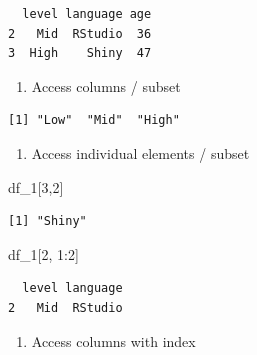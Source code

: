\documentclass[
  letterpaper,
  DIV=11,
  numbers=noendperiod]{scrreprt}
\newenvironment{Shaded}{\begin{snugshade}}{\end{snugshade}}
\newcommand{\DecValTok}[1]{\textcolor[rgb]{0.68,0.00,0.00}{#1}}
\newcommand{\NormalTok}[1]{\textcolor[rgb]{0.00,0.23,0.31}{#1}}
\newcommand{\SpecialCharTok}[1]{\textcolor[rgb]{0.37,0.37,0.37}{#1}}
\providecommand{\tightlist}{%
  \setlength{\itemsep}{0pt}\setlength{\parskip}{0pt}}\usepackage{longtable,booktabs,array}
\begin{document}
\begin{verbatim}
  level language age
2   Mid  RStudio  36
3  High    Shiny  47
\end{verbatim}

\begin{enumerate}
\def\labelenumi{\alph{enumi}.}
\setcounter{enumi}{7}
\tightlist
\item
  Access columns / subset
\end{enumerate}

\begin{Shaded}
\end{Shaded}

\begin{verbatim}
[1] "Low"  "Mid"  "High"
\end{verbatim}

\begin{enumerate}
\def\labelenumi{\roman{enumi}.}
\tightlist
\item
  Access individual elements / subset
\end{enumerate}

\begin{Shaded}
\begin{Highlighting}[]
\NormalTok{df\_1[}\DecValTok{3}\NormalTok{,}\DecValTok{2}\NormalTok{]}
\end{Highlighting}
\end{Shaded}

\begin{verbatim}
[1] "Shiny"
\end{verbatim}

\begin{Shaded}
\begin{Highlighting}[]
\NormalTok{df\_1[}\DecValTok{2}\NormalTok{, }\DecValTok{1}\SpecialCharTok{:}\DecValTok{2}\NormalTok{]}
\end{Highlighting}
\end{Shaded}

\begin{verbatim}
  level language
2   Mid  RStudio
\end{verbatim}

\begin{enumerate}
\def\labelenumi{\alph{enumi}.}
\setcounter{enumi}{9}
\tightlist
\item
  Access columns with index
\end{enumerate}
\end{document}
